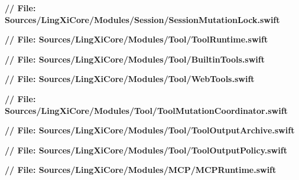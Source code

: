 \documentclass[10pt,a4paper]{article}
\newcommand{\repoRoot}{../../../}
\begin{document}
\noindent\textbf{// File: Sources/LingXiCore/Modules/Session/SessionMutationLock.swift}\par\vspace{2pt}

\vspace{8pt}

\noindent\textbf{// File: Sources/LingXiCore/Modules/Tool/ToolRuntime.swift}\par\vspace{2pt}

\vspace{8pt}

\noindent\textbf{// File: Sources/LingXiCore/Modules/Tool/BuiltinTools.swift}\par\vspace{2pt}

\vspace{8pt}

\noindent\textbf{// File: Sources/LingXiCore/Modules/Tool/WebTools.swift}\par\vspace{2pt}

\vspace{8pt}

\noindent\textbf{// File: Sources/LingXiCore/Modules/Tool/ToolMutationCoordinator.swift}\par\vspace{2pt}

\vspace{8pt}

\noindent\textbf{// File: Sources/LingXiCore/Modules/Tool/ToolOutputArchive.swift}\par\vspace{2pt}

\vspace{8pt}

\noindent\textbf{// File: Sources/LingXiCore/Modules/Tool/ToolOutputPolicy.swift}\par\vspace{2pt}

\vspace{8pt}

\noindent\textbf{// File: Sources/LingXiCore/Modules/MCP/MCPRuntime.swift}\par\vspace{2pt}

\vspace{8pt}
\end{document}
